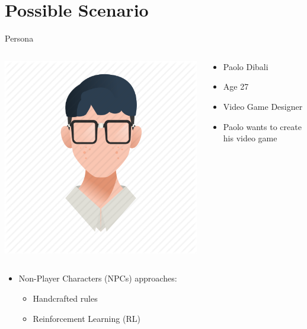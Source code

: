 \section{Possible Scenario}


\begin{frame}{Persona}
	\begin{columns}
		
		\begin{column}{0.5\textwidth}
			\centering
			\includegraphics[width=0.6\linewidth]{images/paolo.png}			
		\end{column}
		
		\begin{column}{0.5\textwidth}
			
			\begin{itemize}
				\item Paolo Dibali
				\item Age 27
				\item Video Game Designer 
				\item Paolo wants to create his video game
			\end{itemize}
			
		\end{column}
		
	\end{columns}
	
	\vspace{0.5cm}
	
	\begin{itemize}
		\item Non-Player Characters (NPCs) approaches:
		\begin{itemize}
			\item Handcrafted rules 
			\item Reinforcement Learning (RL)
		\end{itemize}
	\end{itemize}
	
\end{frame}

